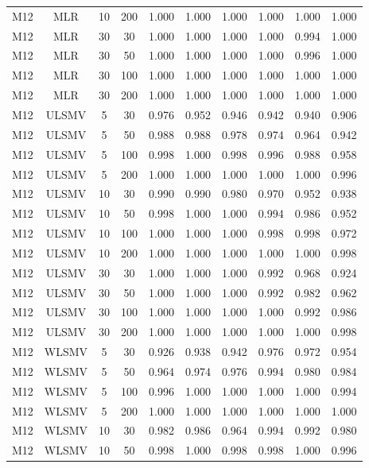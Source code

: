 {\begin{longtable}[!tbp]{@{\extracolsep{\fill}}lccccccccc}
  M12 & MLR & 10 & 200 & 1.000 & 1.000 & 1.000 & 1.000 & 1.000 & 1.000 \\ 
  M12 & MLR & 30 & 30 & 1.000 & 1.000 & 1.000 & 1.000 & 0.994 & 1.000 \\ 
  M12 & MLR & 30 & 50 & 1.000 & 1.000 & 1.000 & 1.000 & 0.996 & 1.000 \\ 
  M12 & MLR & 30 & 100 & 1.000 & 1.000 & 1.000 & 1.000 & 1.000 & 1.000 \\ 
  M12 & MLR & 30 & 200 & 1.000 & 1.000 & 1.000 & 1.000 & 1.000 & 1.000 \\ 
  M12 & ULSMV & 5 & 30 & 0.976 & 0.952 & 0.946 & 0.942 & 0.940 & 0.906 \\ 
  M12 & ULSMV & 5 & 50 & 0.988 & 0.988 & 0.978 & 0.974 & 0.964 & 0.942 \\ 
  M12 & ULSMV & 5 & 100 & 0.998 & 1.000 & 0.998 & 0.996 & 0.988 & 0.958 \\ 
  M12 & ULSMV & 5 & 200 & 1.000 & 1.000 & 1.000 & 1.000 & 1.000 & 0.996 \\ 
  M12 & ULSMV & 10 & 30 & 0.990 & 0.990 & 0.980 & 0.970 & 0.952 & 0.938 \\ 
  M12 & ULSMV & 10 & 50 & 0.998 & 1.000 & 1.000 & 0.994 & 0.986 & 0.952 \\ 
  M12 & ULSMV & 10 & 100 & 1.000 & 1.000 & 1.000 & 0.998 & 0.998 & 0.972 \\ 
  M12 & ULSMV & 10 & 200 & 1.000 & 1.000 & 1.000 & 1.000 & 1.000 & 0.998 \\ 
  M12 & ULSMV & 30 & 30 & 1.000 & 1.000 & 1.000 & 0.992 & 0.968 & 0.924 \\ 
  M12 & ULSMV & 30 & 50 & 1.000 & 1.000 & 1.000 & 0.992 & 0.982 & 0.962 \\ 
  M12 & ULSMV & 30 & 100 & 1.000 & 1.000 & 1.000 & 1.000 & 0.992 & 0.986 \\ 
  M12 & ULSMV & 30 & 200 & 1.000 & 1.000 & 1.000 & 1.000 & 1.000 & 0.998 \\ 
  M12 & WLSMV & 5 & 30 & 0.926 & 0.938 & 0.942 & 0.976 & 0.972 & 0.954 \\ 
  M12 & WLSMV & 5 & 50 & 0.964 & 0.974 & 0.976 & 0.994 & 0.980 & 0.984 \\ 
  M12 & WLSMV & 5 & 100 & 0.996 & 1.000 & 1.000 & 1.000 & 1.000 & 0.994 \\ 
  M12 & WLSMV & 5 & 200 & 1.000 & 1.000 & 1.000 & 1.000 & 1.000 & 1.000 \\ 
  M12 & WLSMV & 10 & 30 & 0.982 & 0.986 & 0.964 & 0.994 & 0.992 & 0.980 \\ 
  M12 & WLSMV & 10 & 50 & 0.998 & 1.000 & 0.998 & 0.998 & 1.000 & 0.996 \\ 

\end{longtable}}
